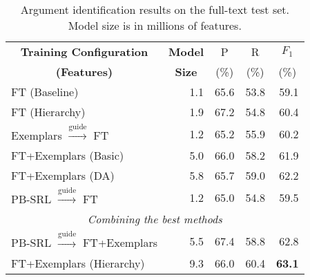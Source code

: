 
\setlength\tabcolsep{4pt}

\begin{table}\centering\small
\def\arraystretch{1}
\begin{tabular}{lr<{\hspace*{5pt}}rrr}%
\toprule
\multicolumn{1}{c}{\textbf{Training Configuration}} 
& \multicolumn{1}{c}{\textbf{Model}} &  \multicolumn{1}{c}{P} &
\multicolumn{1}{c}{R} 
&  \multicolumn{1}{c}{$F_1$} \\
 \multicolumn{1}{c}{\textbf{(Features)}} 
& \multicolumn{1}{c}{\textbf{Size}} 
&  \multicolumn{1}{c}{(\%)} &  \multicolumn{1}{c}{(\%)} &  \multicolumn{1}{c}{(\%)}\\
\midrule
FT (Baseline) & 1.1 & 65.6 & 53.8 & 59.1 \\ %
\midrule
FT (Hierarchy) & 1.9 & 67.2 & 54.8 & 60.4 \\
\midrule
Exemplars $\xrightarrow{\text{guide}}$ FT & 1.2 & 65.2 & 55.9 & 60.2 \\
FT+Exemplars (Basic) & 5.0 & 66.0 & 58.2 & 61.9 \\
FT+Exemplars (DA) & 5.8 & 65.7 & 59.0 & 62.2 \\
\midrule
PB-SRL $\xrightarrow{\text{guide}}$ FT & 1.2 & 65.0 & 54.8 & 59.5 \\
\midrule
\multicolumn{5}{c}{\em{Combining the best methods}}\\
\midrule
PB-SRL $\xrightarrow{\text{guide}}$ FT+Exemplars & 5.5 & 67.4 & 58.8 & 62.8 \\
FT+Exemplars (Hierarchy) & 9.3 & 66.0 & 60.4 & \textbf{63.1} \\
\bottomrule
\end{tabular}
\caption{Argument identification results on the full-text test set.
Model size is in millions of features.
\label{tbl:results}}
\end{table}


